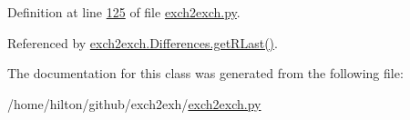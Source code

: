 Definition at line \hyperlink{exch2exch_8py_source_l00125}{125} of file \hyperlink{exch2exch_8py_source}{exch2exch.\+py}.



Referenced by \hyperlink{exch2exch_8py_source_l00148}{exch2exch.\+Differences.\+get\+R\+Last()}.



The documentation for this class was generated from the following file\+:\begin{DoxyCompactItemize}
\item 
/home/hilton/github/exch2exh/\hyperlink{exch2exch_8py}{exch2exch.\+py}\end{DoxyCompactItemize}
